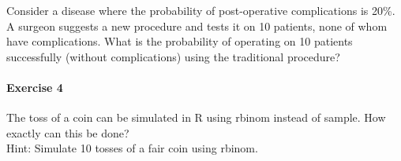 \documentclass[
]{article}
\begin{document}
Consider a disease where the probability of post-operative complications
is 20\%. A surgeon suggests a new procedure and tests it on 10 patients,
none of whom have complications. What is the probability of operating on
10 patients successfully (without complications) using the traditional
procedure?

\hypertarget{exercise-4}{%
\paragraph{Exercise 4}\label{exercise-4}}

The toss of a coin can be simulated in R using rbinom instead of sample.
How exactly can this be done?\\
Hint: Simulate 10 tosses of a fair coin using rbinom.
\end{document}
